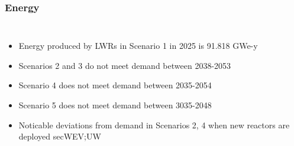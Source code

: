 \begin{frame}
    \frametitle{Energy}
    \begin{columns}
        \column[t]{5cm}
        \begin{itemize}
            \item Energy produced by \glspl{LWR} in Scenario 1 in 2025 is 91.818 GWe-y
            \item Scenarios 2 and 3 do not meet demand between 2038-2053
            \item Scenario 4 does not meet demand between 2035-2054
            \item Scenario 5 does not meet demand between 3035-2048
            \item Noticable deviations from demand in Scenarios 2, 4 when new 
                  reactors are deployed
                  secWEV;UW
        \end{itemize}


\end{columns}
\end{frame}

